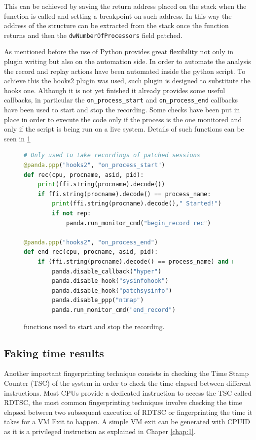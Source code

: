 This can be achieved by saving the return address placed on the stack when the function is called and setting a breakpoint on such address. In this way the address of the structure can be extracted from the stack once the function returns and then the \lstinline{dwNumberOfProcessors} field patched.  


As mentioned before the use of Python provides great flexibility not only in plugin writing but also on the automation side. In order to automate the analysis the record and replay actions have been automated inside the python script. To achieve this the hooks2 plugin was used, such plugin is designed to substitute the hooks one. Although it is not yet finished it already provides some useful callbacks, in particular the \lstinline{on_process_start} and \lstinline{on_process_end} callbacks have been used to start and stop the recording. Some checks have been put in place in order to execute the code only if the process is the one monitored and only if the script is being run on a live system. Details of such functions can be seen in \ref{fig:startstop}

\begin{figure}[htp]
\centering
\begin{lstlisting}[language=Python] 
# Only used to take recordings of patched sessions
@panda.ppp("hooks2", "on_process_start")
def rec(cpu, procname, asid, pid):
    print(ffi.string(procname).decode())
    if ffi.string(procname).decode() == process_name:
        print(ffi.string(procname).decode()," Started!")
        if not rep:
            panda.run_monitor_cmd("begin_record rec")

@panda.ppp("hooks2", "on_process_end")
def end_rec(cpu, procname, asid, pid):
    if (ffi.string(procname).decode() == process_name) and not rep:
        panda.disable_callback("hyper")
        panda.disable_hook("sysinfohook")
        panda.disable_hook("patchsysinfo")
        panda.disable_ppp("ntmap")
        panda.run_monitor_cmd("end_record")
\end{lstlisting}
\caption{functions used to start and stop the recording.}
\label{fig:startstop}
\end{figure}


\subsection{Faking time results}

Another important fingerprinting technique consists in checking the Time Stamp Counter (TSC) of the system in order to check the time elapsed between different instructions. Most CPUs provide a dedicated instruction to access the TSC called RDTSC, the most common fingerprinting techniques involve checking the time elapsed between two subsequent execution of RDTSC or fingerprinting the time it takes for a VM Exit to happen. A simple VM exit can be generated with CPUID as it is a privileged instruction as explained in Chaper \ref{chap:1}.

